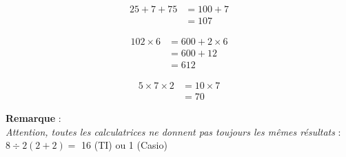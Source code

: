 \documentclass[11pt]{article}
\begin{document}
\begin{minipage}[t]{0.33\textwidth}
\begin{align*}
25 + 7 + 75 &= 100 + 7  \\
            &= 107
\end{align*}

\end{minipage}
\begin{minipage}[t]{0.33\textwidth}

\begin{align*}
102 \times 6 &= 600 + 2 \times 6 \\
             &= 600 + 12 \\
             &= 612
\end{align*}

\end{minipage}
\begin{minipage}[t]{0.33\textwidth}

\begin{align*}
5 \times 7 \times 2 &= 10 \times 7 \\
                    &= 70
\end{align*}
\end{minipage}

\newpage

\textbf{Remarque} : \\
\textit{Attention, toutes les calculatrices ne donnent pas toujours les mêmes résultats} : $8 \div 2(2+2) =$ 16 (TI) ou 1 (Casio)
\end{document}
